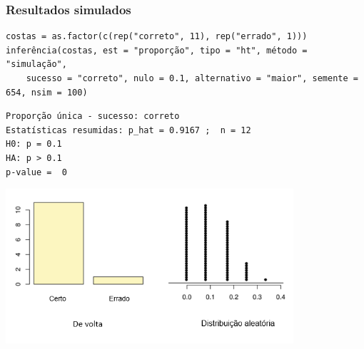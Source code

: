 \begin{frame}[fragile]
\frametitle{Resultados simulados}
\justifying
{\tiny
\begin{Verbatim}[frame=single, formatcom=\color{blue}]
costas = as.factor(c(rep("correto", 11), rep("errado", 1))) 
inferência(costas, est = "proporção", tipo = "ht", método = "simulação",
	sucesso = "correto", nulo = 0.1, alternativo = "maior", semente = 654, nsim = 100)
\end{Verbatim}
}

\pause
\justifying
{\tiny
\begin{Verbatim}[frame=single, formatcom=\color{gray}]
Proporção única - sucesso: correto 
Estatísticas resumidas: p_hat = 0.9167 ;  n = 12 
H0: p = 0.1 
HA: p > 0.1 
p-value =  0 
\end{Verbatim}
}

\centering
\includegraphics[width=0.8\textwidth,height=0.4\textheight]{6-5_small_single_prop/back_HT.png}

\end{frame}

